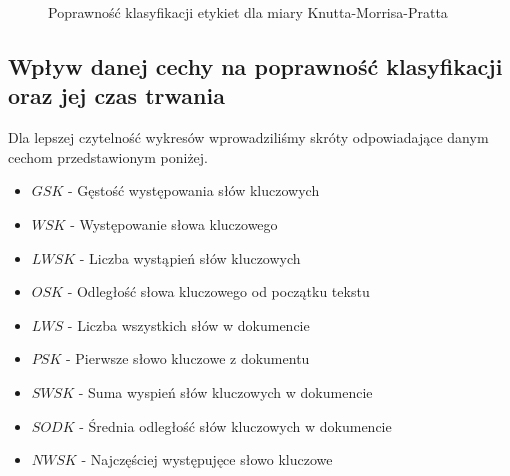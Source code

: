 \documentclass{classrep}
\begin{document}
\begin{figure}[h!]
    \begin{center}
    \end{center}
    \caption{Poprawność klasyfikacji etykiet dla miary Knutta-Morrisa-Pratta}
    \label{ngram_popraw_knutt}
\end{figure}

\FloatBarrier
\subsection{Wpływ danej cechy na poprawność klasyfikacji oraz jej czas trwania}
Dla lepszej czytelność wykresów wprowadziliśmy skróty odpowiadające danym cechom przedstawionym
poniżej.
\begin{itemize}
    \item $GSK$ - Gęstość występowania słów kluczowych
    \item $WSK$ - Występowanie słowa kluczowego
    \item $LWSK$ - Liczba wystąpień słów kluczowych
    \item $OSK$ - Odległość słowa kluczowego od początku tekstu
    \item $LWS$ - Liczba wszystkich słów w dokumencie
    \item $PSK$ - Pierwsze słowo kluczowe z dokumentu
    \item $SWSK$ - Suma wyspień słów kluczowych w dokumencie
    \item $SODK$ - Średnia odległość słów kluczowych w dokumencie
    \item $NWSK$ - Najczęściej występujęce słowo kluczowe
\end{itemize}
\end{document}

